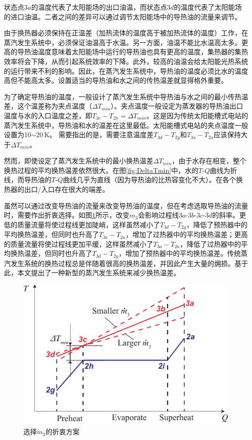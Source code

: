 状态点$3a$的温度代表了太阳能场的出口油温，而状态点$3d$的温度代表了太阳能场的进口油温。二者之间的差异可以通过调节太阳能场中的导热油的流量来调节。

由于换热器必须保持在正温差（加热流体的温度高于被加热流体的温度）工作，在蒸汽发生系统中，必须保证油温高于水温。另一方面，油温不能比水温高太多。更高的导热油温度意味着太阳能场中运行的导热油也具有更高的温度，集热器的集热效率将会下降，从而引起系统效率的下降。此外，较高的油温会给太阳能光热系统的运行带来不利的影响。因此，在蒸汽发生系统中，导热油的温度必须比水的温度高但不能高太多。设置适当的导热油和水之间的传热温差就显得格外重要。

为了确定导热油的温度，一般设计了蒸汽发生系统中导热油与水之间的最小传热温差，这个温差称为夹点温度（$\Delta T_{min}$）。夹点温度一般设定为蒸发器的导热油出口温度与水的入口温度之差，即$T_{3c} - T_{2h} = \Delta T_{min}$。这是因为传统太阳能槽式电站的蒸汽发生系统中，导热油和水的温差在这里最低。太阳能槽式电站的夹点温度一般设置为10$\sim$20$\,\mathrm{K}$。
需要指出的是，需要注意温度差$T_{3d} - T_{2g}$和$T_{3a} - T_{2a}$应该保持大于$\Delta T_{min}$。

然而，即使设定了蒸汽发生系统中的最小换热温差$\Delta T_{min}$，由于水存在相变，整个换热过程的平均换热温差依然很大。在图\ref{fig:DeltaTmin}中，水的$T$-$Q$曲线为折线，而导热油的$T$-$Q$曲线几乎为直线（因为导热油的比热容变化不大）。在各个换热器的出口/入口存在很大的端差。

虽然可以通过改变导热油的流量来改变导热油的温度，但在考虑选取导热油的流量时，需要作出折衷选择。如图\ref{fig:DeltaT}所示，改变$\dot{m}_3$会影响过程线$3a$-$3b$-$3c$-$3d$的斜率。更低的质量流量将使过程线更加陡峭，这样虽然减小了$T_{3d} - T_{2g}$，降低了预热器中的平均换热温差，但同时也升高了$T_{3a} - T_{2a}$，增加了过热器中的平均换热温差；更高的质量流量将使过程线更加平缓，这样虽然减小了$T_{3a} - T_{2a}$，降低了过热器中的平均换热温差，但同时也升高了$T_{3d} - T_{2g}$，增加了预热器中的平均换热温差。传统蒸汽发生系统的换热过程总是伴随着很高的换热温差，并因此产生大量的㶲损。基于此，本文提出了一种新型的蒸汽发生系统来减少换热温差。

\noindent \begin{figure}[htbp]
\begin{center}
	\includegraphics[width = 0.5\columnwidth]{fig/DeltaT}
	\caption{选择$\dot{m}_3$的折衷方案}
	\label{fig:DeltaT}
\end{center}
\end{figure}


